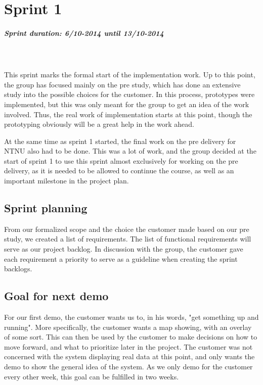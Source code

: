 \documentclass[11pt,a4paper,titlepage,oneside]{report}
\begin{document}
\chapter{Sprint 1}
\paragraph{Sprint duration: 6/10-2014 until 13/10-2014} \hfill \\
\\
\noindent
This sprint marks the formal start of the implementation work. Up to this point, the group has focused mainly on the pre study, which has done an extensive study into the possible choices for the customer. In this process, prototypes were implemented, but this was only meant for the group to get an idea of the work involved. Thus, the real work of implementation starts at this point, though the prototyping obviously will be a great help in the work ahead. 

At the same time as sprint 1 started, the final work on the pre delivery for NTNU also had to be done. This was a lot of work, and the group decided at the start of sprint 1 to use this sprint almost exclusively for working on the pre delivery, as it is needed to be allowed to continue the course, as well as an important milestone in the project plan. 

\section{Sprint planning}
From our formalized scope and the choice the customer made based on our pre study, we created a list of requirements. The list of functional requirements will serve as our project backlog. In discussion with the group, the customer gave each requirement a priority to serve as a guideline when creating the sprint backlogs.

\section{Goal for next demo}
For our first demo, the customer wants us to, in his words, "get something up and running". More specifically, the customer wants a map showing, with an overlay of some sort. This can then be used by the customer to make decisions on how to move forward, and what to prioritize later in the project. The customer was not concerned with the system displaying real data at this point, and only wants the demo to show the general idea of the system. As we only demo for the customer every other week, this goal can be fulfilled in two weeks.
\end{document}
